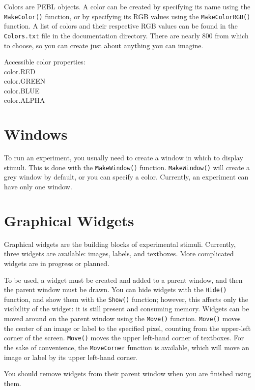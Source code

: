 Colors are PEBL objects.  A color can be created by specifying its name 
using the \texttt{MakeColor()} function, or by specifying its RGB values using the \texttt{MakeColorRGB()} function. A list of colors and their respective RGB values can be found in the \texttt{Colors.txt} file in the documentation directory. There are nearly 800 from which to choose, so you can create 
just about anything you can imagine.

Accessible color properties:\\
 color.RED\\
 color.GREEN\\
 color.BLUE\\
 color.ALPHA\\

\section{Windows}

To run an experiment, you usually need to create a window in which 
to display stimuli.  This is done with the \texttt{MakeWindow()} function. \texttt{MakeWindow()} will create a grey window by default, or you can 
specify a color.  Currently, an experiment can have only one window.


\section{Graphical Widgets}

Graphical widgets are the building blocks of experimental stimuli. 
Currently, three widgets are available: images, labels, and textboxes.  
More complicated widgets are in progress or planned.

To be used, a widget must be created and added to a parent window, and
then the parent window must be drawn.  You can hide widgets with the
\texttt{Hide()} function, and show them with the \texttt{Show()}
function; however, this affects only the visibility of the widget: it
is still present and consuming memory. Widgets can be moved around on
the parent window using the \texttt{Move()} function. \texttt{Move()}
moves the center of an image or label to the specified pixel, counting
from the upper-left corner of the screen. \texttt{Move()} moves the
upper left-hand corner of textboxes.  For the sake of convenience, the
\texttt{MoveCorner} function is available, which will move an image or
label by its upper left-hand corner.

You should remove widgets from their parent window when you are
finished using them.

